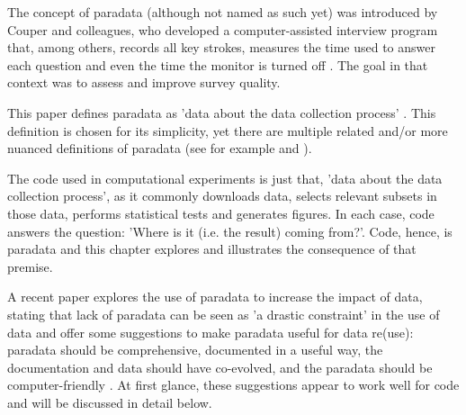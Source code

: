 The concept of paradata (although not named as such yet) 
was introduced by Couper and colleagues,
who developed a computer-assisted interview program
that, among others, records all key strokes,
measures the time used to answer each question 
and even the time the monitor is turned off \cite{couper1998measuring}.
The goal in that context was to assess and improve survey quality.


This paper defines paradata as 'data about the data collection 
process' \cite{choumert2019using}.
This definition is chosen for its simplicity, 
yet there are multiple related and/or more nuanced 
definitions of paradata (see for example \cite{huvila2022improving} 
and \cite{skold2022interrogating}).


The code used in computational experiments is just that, 
'data about the data collection 
process', as it commonly downloads data,
selects relevant subsets in those data,
performs statistical tests and generates figures.
In each case, code answers the question: 
'Where is it (i.e. the result) coming from?'.
Code, hence, is paradata and this chapter explores and illustrates the
consequence of that premise.


A recent paper explores the use of paradata to increase the impact of data,
stating that lack of paradata can be seen as 'a drastic constraint'
in the use of data and offer some suggestions to 
make paradata useful for data re(use):
paradata should be comprehensive, documented in a useful way, 
the documentation and data should have co-evolved, 
and the paradata should be computer-friendly \cite{huvila2022improving}.
At first glance, these suggestions appear to work well for code
and will be discussed in detail below.


